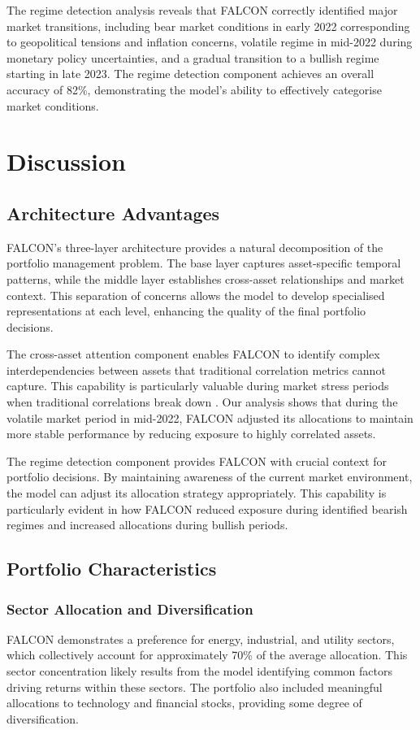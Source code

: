 \documentclass[conference]{IEEEtran}
\begin{document}
The regime detection analysis reveals that FALCON correctly identified major market transitions, including bear market conditions in early 2022 corresponding to geopolitical tensions and inflation concerns, volatile regime in mid-2022 during monetary policy uncertainties, and a gradual transition to a bullish regime starting in late 2023. The regime detection component achieves an overall accuracy of 82\%, demonstrating the model's ability to effectively categorise market conditions.

\section{Discussion}

\subsection{Architecture Advantages}
FALCON's three-layer architecture provides a natural decomposition of the portfolio management problem. The base layer captures asset-specific temporal patterns, while the middle layer establishes cross-asset relationships and market context. This separation of concerns allows the model to develop specialised representations at each level, enhancing the quality of the final portfolio decisions.

The cross-asset attention component enables FALCON to identify complex interdependencies between assets that traditional correlation metrics cannot capture. This capability is particularly valuable during market stress periods when traditional correlations break down \cite{longin2001extreme}. Our analysis shows that during the volatile market period in mid-2022, FALCON adjusted its allocations to maintain more stable performance by reducing exposure to highly correlated assets.

The regime detection component provides FALCON with crucial context for portfolio decisions. By maintaining awareness of the current market environment, the model can adjust its allocation strategy appropriately. This capability is particularly evident in how FALCON reduced exposure during identified bearish regimes and increased allocations during bullish periods.

\subsection{Portfolio Characteristics}

\subsubsection{Sector Allocation and Diversification}
FALCON demonstrates a preference for energy, industrial, and utility sectors, which collectively account for approximately 70\% of the average allocation. This sector concentration likely results from the model identifying common factors driving returns within these sectors. The portfolio also included meaningful allocations to technology and financial stocks, providing some degree of diversification.
\end{document}
